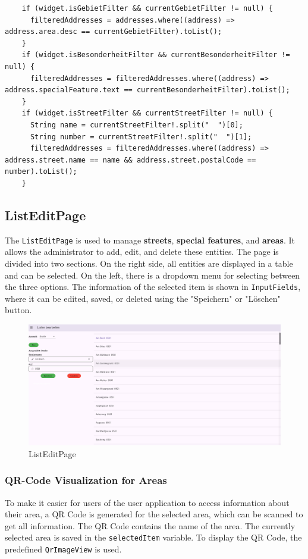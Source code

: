 \lstset{style=mycsharp, caption=Filtering Addresses in AddressPage}
\begin{lstlisting}
    if (widget.isGebietFilter && currentGebietFilter != null) {
      filteredAddresses = addresses.where((address) => address.area.desc == currentGebietFilter).toList();
    }
    if (widget.isBesonderheitFilter && currentBesonderheitFilter != null) {
      filteredAddresses = filteredAddresses.where((address) => address.specialFeature.text == currentBesonderheitFilter).toList();
    }
    if (widget.isStreetFilter && currentStreetFilter != null) {
      String name = currentStreetFilter!.split("  ")[0];
      String number = currentStreetFilter!.split("  ")[1];
      filteredAddresses = filteredAddresses.where((address) => address.street.name == name && address.street.postalCode == number).toList();
    } 
\end{lstlisting}


 

\subsection{ListEditPage}
The \texttt{ListEditPage} is used to manage \textbf{streets}, \textbf{special features}, and \textbf{areas}. It allows the administrator to add, edit, and delete these entities. The page is divided into two sections. On the right side, all entities are displayed in a table and can be selected. On the left, there is a dropdown menu for selecting between the three options. The information of the selected item is shown in \texttt{InputFields}, where it can be edited, saved, or deleted using the "Speichern" or "Löschen" button.

\begin{figure}[H]
    \centering
    \includegraphics[width=0.9\linewidth]{images/AdminPanel/ListEditPage.png}
    \caption{ListEditPage}
\end{figure}

\subsubsection{QR-Code Visualization for Areas}
To make it easier for users of the user application to access information about their area, a QR Code is generated for the selected area, which can be scanned to get all information. The QR Code contains the name of the area. The currently selected area is saved in the \texttt{selectedItem} variable. To display the QR Code, the predefined \texttt{QrImageView} is used.

